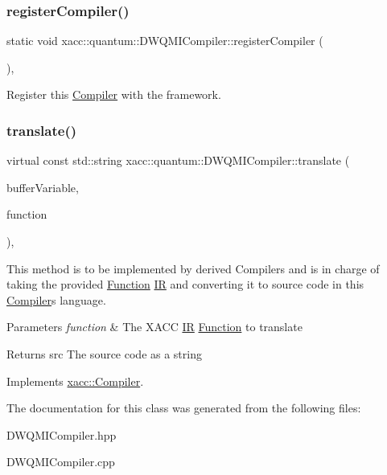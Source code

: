 \subsubsection{\texorpdfstring{register\+Compiler()}{registerCompiler()}}
{\footnotesize\ttfamily static void xacc\+::quantum\+::\+D\+W\+Q\+M\+I\+Compiler\+::register\+Compiler (\begin{DoxyParamCaption}{ }\end{DoxyParamCaption})\hspace{0.3cm}{\ttfamily [inline]}, {\ttfamily [static]}}

Register this \hyperlink{a01629}{Compiler} with the framework. \mbox{\label{a01137_a56a345539665099329209b3b5f6810c9}} 
\subsubsection{\texorpdfstring{translate()}{translate()}}
{\footnotesize\ttfamily virtual const std\+::string xacc\+::quantum\+::\+D\+W\+Q\+M\+I\+Compiler\+::translate (\begin{DoxyParamCaption}\item[{const std\+::string \&}]{buffer\+Variable,  }\item[{std\+::shared\+\_\+ptr$<$ \hyperlink{a01653}{Function} $>$}]{function }\end{DoxyParamCaption})\hspace{0.3cm}{\ttfamily [inline]}, {\ttfamily [virtual]}}

This method is to be implemented by derived Compilers and is in charge of taking the provided \hyperlink{a01653}{Function} \hyperlink{a01677}{IR} and converting it to source code in this \hyperlink{a01629}{Compiler}\textquotesingle{}s language.


\begin{DoxyParams}{Parameters}
{\em function} & The X\+A\+CC \hyperlink{a01677}{IR} \hyperlink{a01653}{Function} to translate \\
\hline
\end{DoxyParams}
\begin{DoxyReturn}{Returns}
src The source code as a string 
\end{DoxyReturn}


Implements \hyperlink{a01629_aeedbe58a33fed29e4d7694ae743e25e7}{xacc\+::\+Compiler}.



The documentation for this class was generated from the following files\+:\begin{DoxyCompactItemize}
\item 
D\+W\+Q\+M\+I\+Compiler.\+hpp\item 
D\+W\+Q\+M\+I\+Compiler.\+cpp\end{DoxyCompactItemize}
